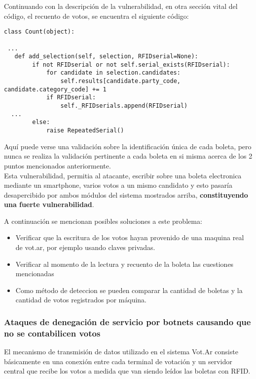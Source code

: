 Continuando con la descripción de la vulnerabilidad, en otra sección vital del código, el recuento de votos, se encuentra el siguiente código:

\begin{lstlisting}
class Count(object):

 ...
   def add_selection(self, selection, RFIDserial=None):
        if not RFIDserial or not self.serial_exists(RFIDserial):
            for candidate in selection.candidates:
                self.results[candidate.party_code, candidate.category_code] += 1
            if RFIDserial:
                self._RFIDserials.append(RFIDserial)
  ...
        else:
            raise RepeatedSerial()
\end{lstlisting}

Aquí puede verse una validación sobre la identificación única de cada boleta, pero nunca se realiza la validación pertinente a cada boleta en si misma acerca de los 2 puntos mencionados anteriormente.\\

Esta vulnerabilidad, permitia al atacante, escribir sobre una boleta electronica mediante un smartphone, varios votos a un mismo candidato y esto pasaría desapercibido por ambos módulos del sistema mostrados arriba, \textbf{constituyendo una fuerte vulnerabilidad}.

A continuación se mencionan posibles soluciones a este problema:

\begin{itemize}
	\item Verificar que la escritura de los votos hayan provenido de una maquina real de vot.ar, por ejemplo usando claves privadas.
	\item Verificar al momento de la lectura y recuento de la boleta las cuestiones mencionadas
	\item Como método de deteccion se pueden comparar la cantidad de boletas y la cantidad de votos registrados por máquina.
\end{itemize}


\subsubsection{Ataques de denegación de servicio por botnets causando que no se contabilicen votos}

El mecanismo de transmisión de datos utilizado en el sistema Vot.Ar consiste básicamente en una conexión entre cada terminal de votación y un servidor central que recibe los votos a medida que van siendo leídos las boletas con RFID. \\

